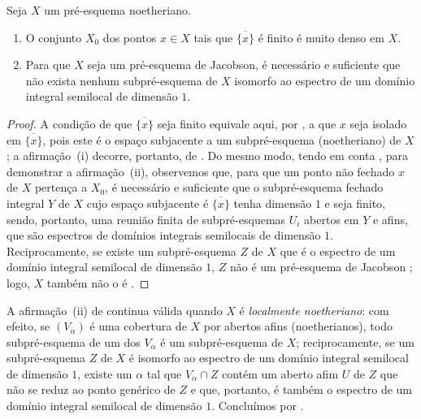 \begin{proposition}[10.5.5]
\label{IV.10.5.5}
Seja $X$ um pré-esquema noetheriano.
\begin{enumerate}[label=(\roman*)]
  \item O conjunto $X_0$ dos pontos $x\in X$ tais que $\overline{\{x\}}$ é finito é muito denso em $X$.
  \item Para que $X$ seja um pré-esquema de Jacobson, é necessário e suficiente que não exista nenhum subpré-esquema de $X$ isomorfo ao espectro de um domínio integral semilocal de dimensão $1$.
\end{enumerate}
\end{proposition}

\begin{proof}
A condição de que $\overline{\{x\}}$ seja finito equivale aqui, por , a que $x$ seja isolado em $\overline{\{x\}}$, pois este é o espaço subjacente a um subpré-esquema (noetheriano) de $X$; a afirmação~(i) decorre, portanto, de .
Do mesmo modo, tendo em conta , para demonstrar a afirmação~(ii), observemos que, para que um ponto não fechado $x$ de $X$ pertença a $X_0$, é necessário e suficiente que o subpré-esquema fechado integral $Y$ de $X$ cujo espaço subjacente é $\overline{\{x\}}$ tenha dimensão $1$ e seja finito, sendo, portanto, uma reunião finita de subpré-esquemas $U_i$ abertos em $Y$ e afins, que são espectros de domínios integrais semilocais de dimensão $1$.
Reciprocamente, se existe um subpré-esquema $Z$ de $X$ que é o espectro de um domínio integral semilocal de dimensão $1$, $Z$ não é um pré-esquema de Jacobson ; logo, $X$ também não o é .
\end{proof}


\begin{remark}[10.5.6]
\label{IV.10.5.6}
A afirmação~(ii) de  continua válida quando $X$ é \emph{localmente noetheriano}: com efeito, se $(V_\alpha)$ é uma cobertura de $X$ por abertos afins (noetherianos), todo subpré-esquema de um dos $V_\alpha$ é um subpré-esquema de $X$; reciprocamente, se um subpré-esquema $Z$ de $X$ é isomorfo ao espectro de um domínio integral semilocal de dimensão $1$, existe um $\alpha$ tal que $V_\alpha\cap Z$ contém um aberto afim $U$ de $Z$ que não se reduz ao ponto genérico de $Z$ e que, portanto, é também o espectro de um domínio integral semilocal de dimensão $1$.
Concluímos por .
\end{remark}

